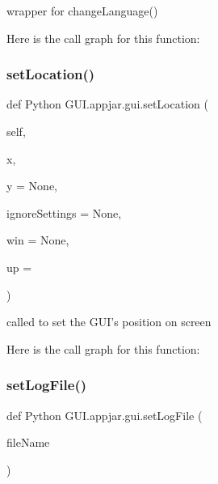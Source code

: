 \begin{DoxyVerb}
\begin{DoxyVerb}wrapper for changeLanguage() \end{DoxyVerb}
 Here is the call graph for this function\+:
\mbox{\label{class_python_01_g_u_i_1_1appjar_1_1gui_a4fe68815735538ab1c8a9842660bf0a4}} 
\subsubsection{\texorpdfstring{set\+Location()}{setLocation()}}
{\footnotesize\ttfamily def Python G\+U\+I.\+appjar.\+gui.\+set\+Location (\begin{DoxyParamCaption}\item[{}]{self,  }\item[{}]{x,  }\item[{}]{y = {\ttfamily None},  }\item[{}]{ignore\+Settings = {\ttfamily None},  }\item[{}]{win = {\ttfamily None},  }\item[{}]{up = {} }\end{DoxyParamCaption})}

\begin{DoxyVerb}called to set the GUI's position on screen \end{DoxyVerb}
 Here is the call graph for this function\+:
\mbox{\label{class_python_01_g_u_i_1_1appjar_1_1gui_a9a03098331c21ee87210a3382754d35b}} 
\subsubsection{\texorpdfstring{set\+Log\+File()}{setLogFile()}}
{\footnotesize\ttfamily def Python G\+U\+I.\+appjar.\+gui.\+set\+Log\+File (\begin{DoxyParamCaption}\item[{}]{file\+Name }\end{DoxyParamCaption})\hspace{0.3cm}{\ttfamily [static]}}




\end{DoxyVerb}
